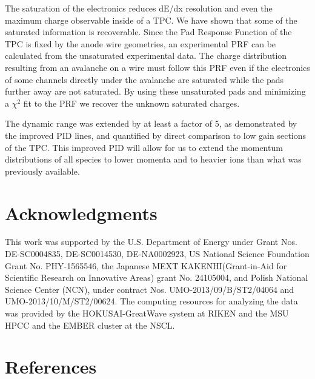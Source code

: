 \documentclass[review]{elsarticle}
\begin{document}
The saturation  of the electronics reduces dE/dx resolution and even the maximum charge observable inside of a TPC.  We have shown that some of the saturated information is recoverable. Since the Pad Response Function of the TPC is fixed by the anode wire geometries, an experimental PRF can be calculated from the unsaturated experimental data. The charge distribution resulting from an avalanche on a wire must follow this PRF even if the electronics of some channels directly under the avalanche are saturated while the pads further away are not saturated. By using these unsaturated pads and minimizing a $\chi^2$ fit  to the PRF we recover the unknown saturated charges. 

The dynamic range was extended by at least a factor of 5, as demonstrated by the improved PID lines, and quantified by direct comparison to low gain sections of the TPC. This improved PID will allow for us to extend the momentum distributions of all species to lower momenta and to heavier ions than what was previously available. 


\section{Acknowledgments}
This work was supported by the U.S. Department of Energy under Grant Nos.  DE-SC0004835,  DE-SC0014530, DE-NA0002923,  US  National Science Foundation Grant  No.  PHY-1565546, the  Japanese  MEXT  KAKENHI(Grant-in-Aid  for  Scientific  Research  on  Innovative  Areas)  grant  No. 24105004, and Polish National Science Center (NCN), under contract Nos. UMO-2013/09/B/ST2/04064 and UMO-2013/10/M/ST2/00624. The computing resources for analyzing the data was provided by the HOKUSAI-GreatWave system at RIKEN and the MSU HPCC and the EMBER cluster at the NSCL. 

\section*{References}


\end{document}
